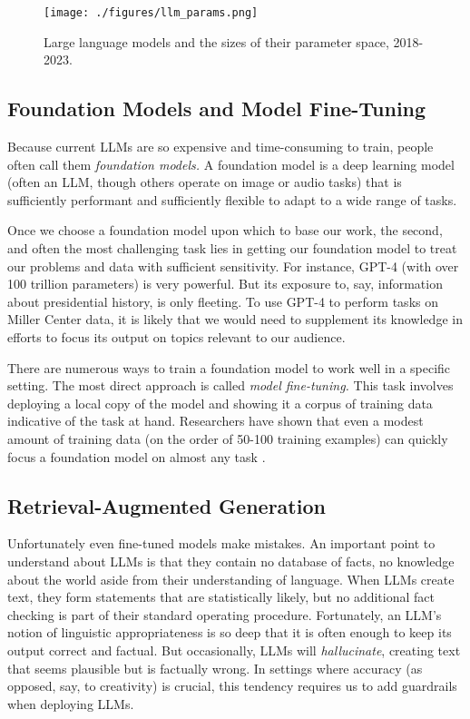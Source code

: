 \documentclass[12pt, oneside]{article}   	%
\begin{document}
\begin{figure}[htbp]
\begin{center}
\texttt{[image: ./figures/llm\_params.png]}
\caption{Large language models and the sizes of their parameter space, 2018-2023.}
\label{figure.llm_size}
\end{center}
\end{figure}


\subsection{Foundation Models and Model Fine-Tuning}\label{section.definitions.foundation-models}

Because current LLMs are so expensive and time-consuming to train, people often call them \emph{foundation models.}  A foundation model is a deep learning model (often an LLM, though others operate on image or audio tasks) that is sufficiently performant and sufficiently flexible to adapt to a wide range of tasks.  

Once we choose a foundation model upon which to base our work, the second, and often the most challenging task lies in getting our foundation model to treat our problems and data with sufficient sensitivity.  For instance, GPT-4 (with over 100 trillion parameters) is very powerful.  But its exposure to, say, information about presidential history, is only fleeting.  To use GPT-4 to perform tasks on Miller Center data, it is likely that we would need to supplement its knowledge in efforts to focus its output on topics relevant to our audience.

There are numerous ways to train a foundation model to work well in a specific setting.  The most direct approach is called \emph{model fine-tuning.}  This task involves deploying a local copy of the model and showing it a corpus of training data indicative of the task at hand.  Researchers have shown that even a modest amount of training data (on the order of 50-100 training examples) can quickly focus a foundation model on almost any task \cite{liu:2022}.

\subsection{Retrieval-Augmented Generation}\label{section.definitions.rag}
Unfortunately even fine-tuned models make mistakes.  An important point to understand about LLMs is that they contain no database of facts, no knowledge about the world aside from their understanding of language.  When LLMs create text, they form statements that are statistically likely, but no additional fact checking is part of their standard operating procedure.  Fortunately, an LLM's notion of linguistic appropriateness is so deep that it is often enough to keep its output correct and factual.  But occasionally, LLMs will \emph{hallucinate}, creating text that seems plausible but is factually wrong.  In settings where accuracy (as opposed, say, to creativity) is crucial, this tendency requires us to add guardrails when deploying LLMs.
\end{document}
